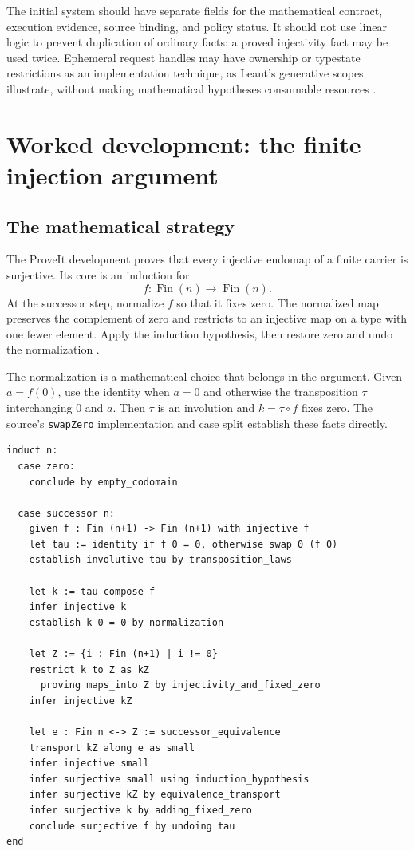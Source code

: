 \documentclass[11pt,letterpaper]{article}
\newcommand{\code}[1]{\nolinkurl{#1}}
\theoremstyle{remark}
\begin{document}
The initial system should have separate fields for the mathematical contract,
execution evidence, source binding, and policy status. It should not use
linear logic to prevent duplication of ordinary facts: a proved injectivity
fact may be used twice. Ephemeral request handles may have ownership or
typestate restrictions as an implementation technique, as Leant's generative
scopes illustrate, without making mathematical hypotheses consumable resources
\cite{postverify}.

\section{Worked development: the finite injection argument}\label{sec:finite}

\subsection{The mathematical strategy}
The ProveIt development proves that every injective endomap of a finite carrier
is surjective. Its core is an induction for
\[
 f:\operatorname{Fin}(n)\to\operatorname{Fin}(n).
\]
At the successor step, normalize $f$ so that it fixes zero. The normalized map
preserves the complement of zero and restricts to an injective map on a type
with one fewer element. Apply the induction hypothesis, then restore zero and
undo the normalization \cite{finite}.

The normalization is a mathematical choice that belongs in the argument.
Given $a=f(0)$, use the identity when $a=0$ and otherwise the transposition
$\tau$ interchanging $0$ and $a$. Then $\tau$ is an involution and
$k=\tau\circ f$ fixes zero. The source's \code{swapZero} implementation and
case split establish these facts directly.

\begin{lstlisting}[caption={Proposed Karst proof of the inductive step.}]
induct n:
  case zero:
    conclude by empty_codomain

  case successor n:
    given f : Fin (n+1) -> Fin (n+1) with injective f
    let tau := identity if f 0 = 0, otherwise swap 0 (f 0)
    establish involutive tau by transposition_laws

    let k := tau compose f
    infer injective k
    establish k 0 = 0 by normalization

    let Z := {i : Fin (n+1) | i != 0}
    restrict k to Z as kZ
      proving maps_into Z by injectivity_and_fixed_zero
    infer injective kZ

    let e : Fin n <-> Z := successor_equivalence
    transport kZ along e as small
    infer injective small
    infer surjective small using induction_hypothesis
    infer surjective kZ by equivalence_transport
    infer surjective k by adding_fixed_zero
    conclude surjective f by undoing tau
end
\end{lstlisting}
\end{document}
